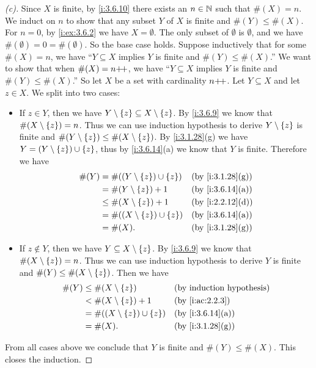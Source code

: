 \begin{proof}[(c)]
  Since \(X\) is finite, by \cref{i:3.6.10} there exists an \(n \in \mathbb{N}\) such that \(\#(X) = n\).
  We induct on \(n\) to show that any subset \(Y\) of \(X\) is finite and \(\#(Y) \leq \#(X)\).
  For \(n = 0\), by \cref{i:ex:3.6.2} we have \(X = \emptyset\).
  The only subset of \(\emptyset\) is \(\emptyset\), and we have \(\#(\emptyset) = 0 = \#(\emptyset)\).
  So the base case holds.
  Suppose inductively that for some \(\#(X) = n\), we have ``\(Y \subseteq X\) implies \(Y\) is finite and \(\#(Y) \leq \#(X)\).''
  We want to show that when \(\#(X) = n{+}\!{+}\), we have ``\(Y \subseteq X\) implies \(Y\) is finite and \(\#(Y) \leq \#(X)\).''
  So let \(X\) be a set with cardinality \(n{+}\!{+}\).
  Let \(Y \subseteq X\) and let \(z \in X\).
  We split into two cases:
  \begin{itemize}
    \item If \(z \in Y\), then we have \(Y \setminus \left\lbrace z\right\rbrace \subseteq X \setminus \left\lbrace z\right\rbrace\).
          By \cref{i:3.6.9} we know that \(\#(X \setminus \left\lbrace z\right\rbrace) = n\).
          Thus we can use induction hypothesis to derive \(Y \setminus \left\lbrace z\right\rbrace\) is finite and \(\#(Y \setminus \left\lbrace z\right\rbrace) \leq \#(X \setminus \left\lbrace z\right\rbrace)\).
          By \cref{i:3.1.28}(g) we have \(Y = (Y \setminus \left\lbrace z\right\rbrace) \cup \left\lbrace z\right\rbrace\), thus by \cref{i:3.6.14}(a) we know that \(Y\) is finite.
          Therefore we have
          \begin{align*}
            \#(Y) & = \#((Y \setminus \set{z}) \cup \set{z}) &  & \by{i:3.1.28}[g] \\
                  & = \#(Y \setminus \set{z}) + 1            &  & \by{i:3.6.14}[a] \\
                  & \leq \#(X \setminus \set{z}) + 1         &  & \by{i:2.2.12}[d] \\
                  & = \#((X \setminus \set{z}) \cup \set{z}) &  & \by{i:3.6.14}[a] \\
                  & = \#(X).                                 &  & \by{i:3.1.28}[g]
          \end{align*}
    \item If \(z \notin Y\), then we have \(Y \subseteq X \setminus \left\lbrace z\right\rbrace\).
          By \cref{i:3.6.9} we know that \(\#(X \setminus \left\lbrace z\right\rbrace) = n\).
          Thus we can use induction hypothesis to derive \(Y\) is finite and \(\#(Y) \leq \#(X \setminus \left\lbrace z\right\rbrace)\).
          Then we have
          \begin{align*}
            \#(Y) & \leq \#(X \setminus \set{z})             &  & \byIH            \\
                  & < \#(X \setminus \set{z}) + 1            &  & \by{i:ac:2.2.3}  \\
                  & = \#((X \setminus \set{z}) \cup \set{z}) &  & \by{i:3.6.14}[a] \\
                  & = \#(X).                                 &  & \by{i:3.1.28}[g]
          \end{align*}
  \end{itemize}
  From all cases above we conclude that \(Y\) is finite and \(\#(Y) \leq \#(X)\).
  This closes the induction.


\end{proof}
